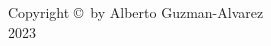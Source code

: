 \pagestyle{plain}
\normalsize
\begin{spacing}{2}


\vspace*{\fill}

\begin{center}
Copyright \copyright\ by Alberto Guzman-Alvarez\\
2023
\end{center}

\vspace*{\fill}
    \end{spacing}        


\newpage